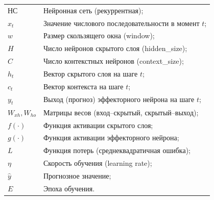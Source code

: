 
\noindent
\begin{tabular}{@{}p{2.6cm}@{\ \mdash\ }p{12.0cm}@{}}
НС & Нейронная сеть (рекуррентная);\\
$x_t$ & Значение числового последовательности в момент $t$;\\
$w$ & Размер скользящего окна (window);\\
$H$ & Число нейронов скрытого слоя (hidden\_size);\\
$C$ & Число контекстных нейронов (context\_size);\\
$h_t$ & Вектор скрытого слоя на шаге $t$;\\
$c_t$ & Вектор контекста на шаге $t$;\\
$y_t$ & Выход (прогноз) эффекторного нейрона на шаге $t$;\\
$W_{xh}, W_{ho}$ & Матрицы весов (вход--скрытый, скрытый--выход);\\
$f(\cdot)$ & Функция активации скрытого слоя;\\
$g(\cdot)$ & Функция активации эффекторного нейрона;\\
$L$ & Функция потерь (среднеквадратичная ошибка);\\
$\eta$ & Скорость обучения (learning rate);\\
$\hat{y}$ & Прогнозное значение;\\
$E$ & Эпоха обучения.
\end{tabular}
